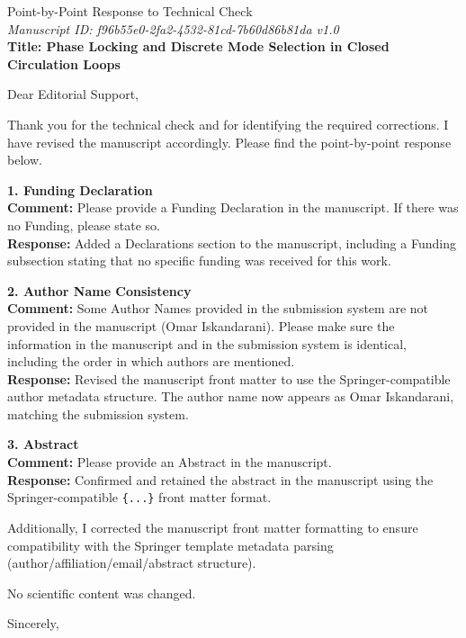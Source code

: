 \documentclass[a4paper,10pt]{letter}
\date{\today}
\begin{document}
    \begin{letter}{Point-by-Point Response to Technical Check\\
    \textit{Manuscript ID: f96b55e0-2fa2-4532-81cd-7b60d86b81da v1.0}\\
    \textbf{Title: Phase Locking and Discrete Mode Selection in Closed Circulation Loops}}

    \opening{Dear Editorial Support,}

    Thank you for the technical check and for identifying the required corrections. I have revised the manuscript accordingly. Please find the point-by-point response below.

    \medskip
    \noindent\textbf{1. Funding Declaration}\\
    \textbf{Comment:} Please provide a Funding Declaration in the manuscript. If there was no Funding, please state so.\\
    \textbf{Response:} Added a Declarations section to the manuscript, including a Funding subsection stating that no specific funding was received for this work.

    \medskip
    \noindent\textbf{2. Author Name Consistency}\\
    \textbf{Comment:} Some Author Names provided in the submission system are not provided in the manuscript (Omar Iskandarani). Please make sure the information in the manuscript and in the submission system is identical, including the order in which authors are mentioned.\\
    \textbf{Response:} Revised the manuscript front matter to use the Springer-compatible author metadata structure. The author name now appears as Omar Iskandarani, matching the submission system.

    \medskip
    \noindent\textbf{3. Abstract}\\
    \textbf{Comment:} Please provide an Abstract in the manuscript.\\
    \textbf{Response:} Confirmed and retained the abstract in the manuscript using the Springer-compatible \texttt{\string\abstract\{...\}} front matter format.

    \medskip
    Additionally, I corrected the manuscript front matter formatting to ensure compatibility with the Springer template metadata parsing (author/affiliation/email/abstract structure).

    No scientific content was changed.

    \closing{Sincerely,}

    \end{letter}
\end{document}
